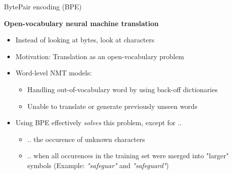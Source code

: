 
\begin{vbframe}{BytePair encoding (BPE)}

\vfill

\textbf{Open-vocabulary neural machine translation \href{https://www.aclweb.org/anthology/P16-1162.pdf}{}}
	
	\begin{itemize}
		\item Instead of looking at bytes, look at characters
		\item Motivation: Translation as an open-vocabulary problem
		\item Word-level NMT models:
			\begin{itemize}
				\item Handling out-of-vocabulary word by using back-off dictionaries
				\item Unable to translate or generate previously unseen words
			\end{itemize}
		\item Using BPE effectively \textit{solves} this problem, except for ..
			\begin{itemize}
				\item .. the occurence of unknown characters
				\item .. when all occurences in the training set were merged into "larger" symbols
							(Example: \textit{"safeguar"} and \textit{"safeguard"})
			\end{itemize}
	\end{itemize}

\vfill

\end{vbframe}


